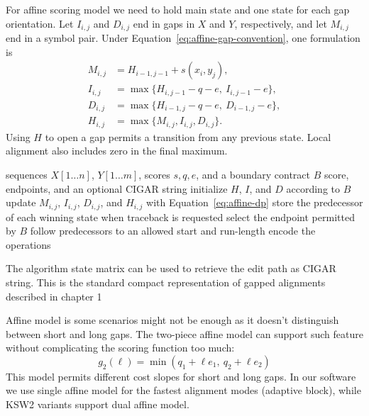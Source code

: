 For affine scoring model we need to hold main state and one state for each gap orientation.
Let \(I_{i,j}\) and \(D_{i,j}\) end in gaps in \(X\) and \(Y\), respectively,
and let \(M_{i,j}\) end in a symbol pair. Under
Equation~\ref{eq:affine-gap-convention}, one formulation is
\begin{equation}
\begin{aligned}
  M_{i,j} &= H_{i-1,j-1}+s(x_i,y_j),\\
  I_{i,j} &= \max\{H_{i,j-1}-q-e,\ I_{i,j-1}-e\},\\
  D_{i,j} &= \max\{H_{i-1,j}-q-e,\ D_{i-1,j}-e\},\\
  H_{i,j} &= \max\{M_{i,j},I_{i,j},D_{i,j}\}.
\end{aligned}
\label{eq:affine-dp}
\end{equation}
Using \(H\) to open a gap permits a transition from any previous state. Local
alignment also includes zero in the final maximum.

\begin{algorithm}[H]
  \caption{Affine-gap alignment with an explicit boundary contract}
  \label{alg:affine-dp}
  \begin{algorithmic}[1]
    \Require sequences \(X[1\ldots n]\), \(Y[1\ldots m]\), scores \(s,q,e\),
      and a boundary contract \(B\)
    \Ensure score, endpoints, and an optional CIGAR string
    \State initialize \(H\), \(I\), and \(D\) according to \(B\)
        \State update \(M_{i,j}\), \(I_{i,j}\), \(D_{i,j}\), and \(H_{i,j}\)
          with Equation~\ref{eq:affine-dp}
        \State store the predecessor of each winning state when traceback is
          requested
      \EndFor
    \EndFor
    \State select the endpoint permitted by \(B\)
    \State follow predecessors to an allowed start and run-length encode the
      operations
  \end{algorithmic}
\end{algorithm}

The algorithm state matrix can be used to retrieve the edit path as CIGAR string. This is
the standard compact representation of gapped alignments described in chapter 1\cite{sam_format_specification}

Affine model is some scenarios might not be enough as it doesn't distinguish between short and long gaps. The two-piece affine model can support such feature without complicating the scoring function too much:
\[
  g_2(\ell)=\min(q_1+\ell e_1,\ q_2+\ell e_2)
\]
This model permits different cost slopes for short and long gaps. In our software we use single affine model for the fastest alignment modes (adaptive block), while KSW2 variants support dual affine model.

